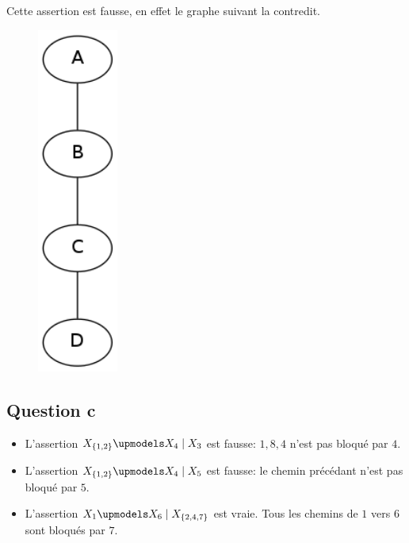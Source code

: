\documentclass{article}
\begin{document}
Cette assertion est fausse, en effet le graphe suivant la contredit.

\begin{figure}[h]
\includegraphics[width=100px]{5.png}
\end{figure}


\subsection{Question c}

\begin{itemize}
\item L'assertion $X_{\{1, 2\}} \upmodels X_4 \mid X_3$ est fausse: ${1, 8, 4}$ n'est pas
bloqué par $4$.
\item L'assertion $X_{\{1, 2\}} \upmodels X_4 \mid X_5$ est fausse: le chemin précédant
n'est pas bloqué par $5$.
\item L'assertion $X_1 \upmodels X_6 \mid X_{\{2, 4, 7\}}$ est vraie. Tous les chemins
de $1$ vers $6$ sont bloqués par $7$.
\end{itemize}
\end{document}
